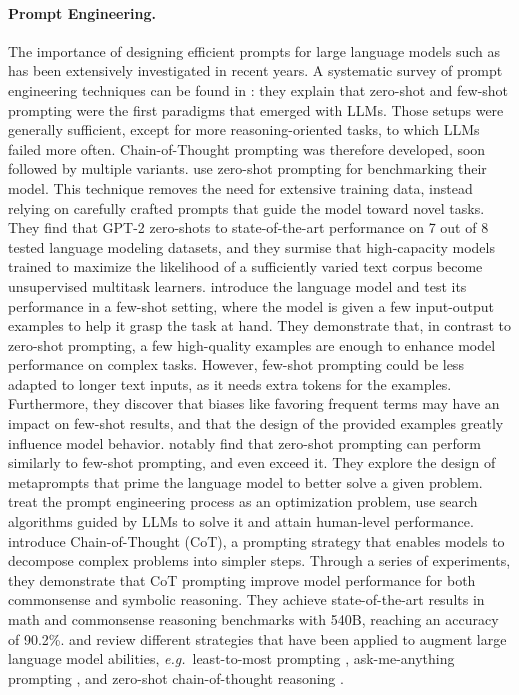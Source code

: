 \paragraph{Prompt Engineering.}
The importance of designing efficient prompts for large language models such as {\gptthree} has been extensively investigated in recent years. A systematic survey of prompt engineering techniques can be found in \citet{sahoo2024systematic}: they explain that zero-shot and few-shot prompting were the first paradigms that emerged with LLMs. Those setups were generally sufficient, except for more reasoning-oriented tasks, to which LLMs failed more often. Chain-of-Thought prompting \citep{wei2022chain} was therefore developed, soon followed by multiple variants.
\citet{radford2019language} use zero-shot prompting for benchmarking their {\gptt} model. This technique removes the need for extensive training data, instead relying on carefully crafted prompts that guide the model toward novel tasks. They find that GPT-2 zero-shots to state-of-the-art performance on 7 out of 8 tested language modeling datasets, and they surmise that high-capacity models trained to maximize the likelihood of a sufficiently varied text corpus become unsupervised multitask learners. \citet{brown2020language} introduce the {\gptthree} language model and test its performance in a few-shot setting, where the model is given a few input-output examples to help it grasp the task at hand. They demonstrate that, in contrast to zero-shot prompting, a few high-quality examples are enough to enhance model performance on complex tasks. However, few-shot prompting could be less adapted to longer text inputs, as it needs extra tokens for the examples. Furthermore, they discover that biases like favoring frequent terms may have an impact on few-shot results, and that the design of the provided examples greatly influence model behavior. \citet{reynolds2021prompt} notably find that zero-shot prompting can perform similarly to few-shot prompting, and even exceed it. They explore the design of metaprompts that prime the language model to better solve a given problem. \citet{zhou2022large} treat the prompt engineering process as an optimization problem, use search algorithms guided by LLMs to solve it and attain human-level performance.
\citet{wei2022chain} introduce Chain-of-Thought (CoT), a prompting strategy that enables models to decompose complex problems into simpler steps. Through a series of experiments, they demonstrate that CoT prompting improve model performance for both commonsense and symbolic reasoning. They achieve state-of-the-art results in math and commonsense reasoning benchmarks with {\palm} 540B, reaching an accuracy of 90.2\%. \citet{wei2022emergent} and \citet{white2023prompt} review different strategies that have been applied to augment large language model abilities, \textit{e.g.}\ least-to-most prompting \citep{zhou2022least}, ask-me-anything prompting \citep{arora2022askma}, and zero-shot chain-of-thought reasoning \citep{kojima2022large}.\\

